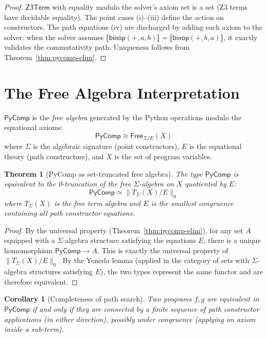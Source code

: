 \documentclass[11pt,a4paper]{report}
\theoremstyle{definition}
\theoremstyle{plain}
\newtheorem{theorem}[definition]{Theorem}
\newtheorem{corollary}[definition]{Corollary}
\newcommand{\den}[1]{\llbracket #1 \rrbracket}
\begin{document}
\begin{proof}
$\mathsf{Z3Term}$ with equality modulo the solver's axiom set is a set
(Z3 terms have decidable equality).  The point cases (i)--(iii) define
the action on constructors.  The path equations (iv) are discharged by
adding each axiom to the solver: when the solver assumes
$\den{\mathsf{binop}(+, a, b)} = \den{\mathsf{binop}(+, b, a)}$,
it exactly validates the commutativity path.  Uniqueness follows from
Theorem~\ref{thm:pycomp-elim}.
\end{proof}

\section{The Free Algebra Interpretation}

$\mathsf{PyComp}$ is the \emph{free algebra} generated by the Python
operations modulo the equational axioms:
\[
  \mathsf{PyComp} \cong \mathsf{Free}_{\Sigma/E}(X)
\]
where $\Sigma$ is the algebraic signature (point constructors), $E$ is
the equational theory (path constructors), and $X$ is the set of
program variables.

\begin{theorem}[PyComp as set-truncated free algebra]
\label{thm:pycomp-free}
The type $\mathsf{PyComp}$ is equivalent to the 0-truncation of the
free $\Sigma$-algebra on $X$ quotiented by $E$:
\[
  \mathsf{PyComp} \simeq \bigl\| T_\Sigma(X) / E \bigr\|_0
\]
where $T_\Sigma(X)$ is the free term algebra and $E$ is the smallest
congruence containing all path constructor equations.
\end{theorem}

\begin{proof}
By the universal property (Theorem~\ref{thm:pycomp-elim}), for any set
$A$ equipped with a $\Sigma$-algebra structure satisfying the equations
$E$, there is a unique homomorphism $\mathsf{PyComp} \to A$.  This is
exactly the universal property of $\|T_\Sigma(X)/E\|_0$.  By the
Yoneda lemma (applied in the category of sets with $\Sigma$-algebra
structures satisfying $E$), the two types represent the same functor
and are therefore equivalent.
\end{proof}

\begin{corollary}[Completeness of path search]
\label{cor:path-completeness}
Two programs $f, g$ are equivalent in $\mathsf{PyComp}$ if and only if
they are connected by a finite sequence of path constructor applications
(in either direction), possibly under congruence (applying an axiom
inside a sub-term).
\end{corollary}
\end{document}
